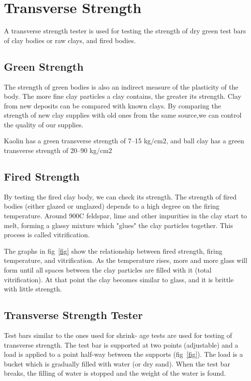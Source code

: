 \section{Transverse Strength}
A transverse strength tester is used for testing the strength of dry green test 
bars of clay bodies or raw clays, and fired bodies.
\subsection{Green Strength}
The strength of green bodies is also an indirect measure of the plasticity of 
the body. The more fine clay particles a clay contains, the greater its 
strength. Clay from new deposits can be compared with known clays. By comparing 
the strength of new clay supplies with old ones from the same source,we can 
control the quality of our supplies.

Kaolin has a green transverse strength of 7--15 kg/cm$2$, and ball clay has a 
green transverse strength of 20--90 kg/cm$2$
\subsection{Fired Strength}
By testing the fired clay body, we can check its strength. The strength of 
fired bodies (either glazed or unglazed) depends to a high degree on the 
firing temperature. Around 900\degree C feldspar, lime and other impurities in 
the clay start to melt, forming a glassy mixture which "glues" the clay 
particles together. This process is called vitrification.

The graphs in fig~\ref{fig} show the relationship between fired strength, 
firing temperature, and vitrification. As the temperature rises, more and more 
glass will form until all spaces between the clay particles are filled with it 
(total vitrification). At that point the clay becomes similar to glass, and it 
is brittle with little strength.
\subsection{Transverse Strength Tester}
Test bars similar to the ones used for shrink- age tests are used for testing 
of transverse strength. The test bar is supported at two points (adjustable) 
and a load is applied to a point half-way between the supports (fig~\ref{fig}). 
The load is a bucket which is gradually filled with water (or dry sand). When 
the test bar breaks, the filling of water is stopped and the weight of the 
water is found.


